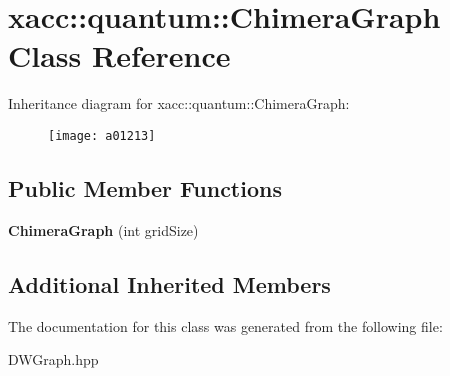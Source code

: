\hypertarget{a01213}{}\section{xacc\+:\+:quantum\+:\+:Chimera\+Graph Class Reference}
\label{a01213}
Inheritance diagram for xacc\+:\+:quantum\+:\+:Chimera\+Graph\+:\begin{figure}[H]
\begin{center}
\leavevmode
\texttt{[image: a01213]}
\end{center}
\end{figure}
\subsection*{Public Member Functions}
\begin{DoxyCompactItemize}
\item 
\mbox{\label{a01213_a64f23e464ba85d6625fe1fc2d2608052}} 
{\bfseries Chimera\+Graph} (int grid\+Size)
\end{DoxyCompactItemize}
\subsection*{Additional Inherited Members}


The documentation for this class was generated from the following file\+:\begin{DoxyCompactItemize}
\item 
D\+W\+Graph.\+hpp\end{DoxyCompactItemize}
